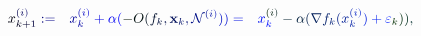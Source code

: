 \documentclass[12pt]{article}
\begin{document}
\makeatletter
\renewcommand*{\@textcolor}[3]{%
  \protect\leavevmode
  \begingroup
    \color#1{#2}#3%
  \endgroup
}
\makeatother
\begin{displaymath}
\begin{array} {rlr} \displaystyle { \mathcolor[RGB]{0,0,15}{x} _ { \mathcolor[RGB]{0,0,30}{k} \mathcolor[RGB]{0,0,45}{+} \mathcolor[RGB]{0,0,60}{1} } ^ { \mathcolor[RGB]{0,0,75}{(} \mathcolor[RGB]{0,0,90}{i} \mathcolor[RGB]{0,0,105}{)} } \mathcolor[RGB]{0,0,120}{:} \mathcolor[RGB]{0,0,135}{=} } & \displaystyle { { } \mathcolor[RGB]{0,0,150}{x} _ { \mathcolor[RGB]{0,0,165}{k} } ^ { \mathcolor[RGB]{0,0,180}{(} \mathcolor[RGB]{0,0,195}{i} \mathcolor[RGB]{0,0,210}{)} } \mathcolor[RGB]{0,0,225}{+} \mathcolor[RGB]{0,0,240}{\alpha} \mathcolor[RGB]{0,0,255}{(} \mathcolor[RGB]{0,15,0}{-} \mathcolor[RGB]{0,15,15}{O} \mathcolor[RGB]{0,15,30}{(} \mathcolor[RGB]{0,15,45}{f} _ { \mathcolor[RGB]{0,15,60}{k} } \mathcolor[RGB]{0,15,75}{,} { \mathbf { \mathcolor[RGB]{0,15,90}{x} } } _ { \mathcolor[RGB]{0,15,105}{k} } \mathcolor[RGB]{0,15,120}{,} \mathcal { \mathcolor[RGB]{0,15,135}{N} } ^ { \mathcolor[RGB]{0,15,150}{(} \mathcolor[RGB]{0,15,165}{i} \mathcolor[RGB]{0,15,180}{)} } \mathcolor[RGB]{0,15,195}{)} \mathcolor[RGB]{0,15,210}{)} \mathcolor[RGB]{0,15,225}{=} } & \displaystyle { \mathcolor[RGB]{0,15,240}{x} _ { \mathcolor[RGB]{0,15,255}{k} } ^ { \mathcolor[RGB]{0,30,0}{(} \mathcolor[RGB]{0,30,15}{i} \mathcolor[RGB]{0,30,30}{)} } \mathcolor[RGB]{0,30,45}{-} \mathcolor[RGB]{0,30,60}{\alpha} \mathcolor[RGB]{0,30,75}{(} \mathcolor[RGB]{0,30,90}{\nabla} \mathcolor[RGB]{0,30,105}{f} _ { \mathcolor[RGB]{0,30,120}{k} } \mathcolor[RGB]{0,30,135}{(} \mathcolor[RGB]{0,30,150}{x} _ { \mathcolor[RGB]{0,30,165}{k} } ^ { \mathcolor[RGB]{0,30,180}{(} \mathcolor[RGB]{0,30,195}{i} \mathcolor[RGB]{0,30,210}{)} } \mathcolor[RGB]{0,30,225}{)} \mathcolor[RGB]{0,30,240}{+} \mathcolor[RGB]{0,30,255}{\varepsilon} _ { \mathcolor[RGB]{0,45,0}{k} } \mathcolor[RGB]{0,45,15}{)} \mathcolor[RGB]{0,45,30}{)} \mathcolor[RGB]{0,45,45}{,} } \end{array}
\end{displaymath}
\end{document}
